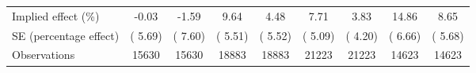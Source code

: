 {\begin{tabular}{l*{8}{c}}
\hline
Implied effect (\%)&       -0.03         &       -1.59         &        9.64         &        4.48         &        7.71         &        3.83         &       14.86         &        8.65         \\
SE (percentage effect)&    (  5.69)         &    (  7.60)         &    (  5.51)         &    (  5.52)         &    (  5.09)         &    (  4.20)         &    (  6.66)         &    (  5.68)         \\
Observations&       15630         &       15630         &       18883         &       18883         &       21223         &       21223         &       14623         &       14623         \\
\hline\hline
\end{tabular}
}
